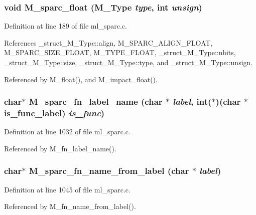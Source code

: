 \subsubsection{\setlength{\rightskip}{0pt plus 5cm}void M\_\-sparc\_\-float (\bf{M\_\-Type} {\em type}, int {\em unsign})}\label{ml__sparc_8c_00a434c2eb5c995f8b54f0893b4422f0}




Definition at line 189 of file ml\_\-sparc.c.

References \_\-struct\_\-M\_\-Type::align, M\_\-SPARC\_\-ALIGN\_\-FLOAT, M\_\-SPARC\_\-SIZE\_\-FLOAT, M\_\-TYPE\_\-FLOAT, \_\-struct\_\-M\_\-Type::nbits, \_\-struct\_\-M\_\-Type::size, \_\-struct\_\-M\_\-Type::type, and \_\-struct\_\-M\_\-Type::unsign.

Referenced by M\_\-float(), and M\_\-impact\_\-float().
\subsubsection{\setlength{\rightskip}{0pt plus 5cm}char$\ast$ M\_\-sparc\_\-fn\_\-label\_\-name (char $\ast$ {\em label}, int($\ast$)(char $\ast$is\_\-func\_\-label) {\em is\_\-func})}\label{ml__sparc_8c_880a27dd1b63d819a71b50d876b967e3}




Definition at line 1032 of file ml\_\-sparc.c.

Referenced by M\_\-fn\_\-label\_\-name().
\subsubsection{\setlength{\rightskip}{0pt plus 5cm}char$\ast$ M\_\-sparc\_\-fn\_\-name\_\-from\_\-label (char $\ast$ {\em label})}\label{ml__sparc_8c_2bdb33821bd5adb9064cac42d5dbb44a}




Definition at line 1045 of file ml\_\-sparc.c.

Referenced by M\_\-fn\_\-name\_\-from\_\-label().
